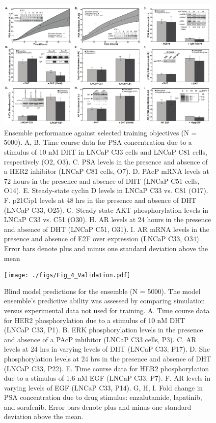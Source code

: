 \documentclass[12pt]{article}
\begin{document}
\clearpage

\begin{figure}\centering
\includegraphics[width=1.0\textwidth]{./figs/Fig_2_Training.pdf}
\caption{Ensemble performance against selected training objectives (N = 5000). A, B. Time course data for PSA concentration due to a stimulus of 10 nM DHT in LNCaP C33 cells and LNCaP C81 cells, respectively (O2, O3). C. PSA levels in the presence and absence of a HER2 inhibitor (LNCaP C81 cells, O7). D. PAcP mRNA levels at 72 hours in the presence and absence of DHT (LNCaP C51 cells, O14). E. Steady-state cyclin D levels in LNCaP C33 vs. C81 (O17). F. p21Cip1 levels at 48 hrs in the presence and absence of DHT (LNCaP C33, O25). G. Steady-state AKT phosphorylation levels in LNCaP C33 vs. C51 (O30). H. AR levels at 24 hours in the presence and absence of DHT (LNCaP C51, O31). I. AR mRNA levels in the presence and absence of E2F over expression (LNCaP C33, O34). Error bars denote plus and minus one standard deviation above the mean}
\label{fg:Training}
\end{figure}

\clearpage

\begin{figure}\centering
\texttt{[image: ./figs/Fig\_4\_Validation.pdf]}
\caption{Blind model predictions for the ensemble (N = 5000). The model ensemble’s predictive ability was assessed by comparing simulation versus experimental data not used for training. A. Time course data for HER2 phosphorylation due to a stimulus of 10 nM DHT (LNCaP C33, P1). B. ERK phosphorylation levels in the presence and absence of a PAcP inhibitor (LNCaP C33 cells, P3). C. AR levels at 24 hrs in varying levels of DHT (LNCaP C33, P17). D. Shc phosphorylation levels at 24 hrs in the presence and absence of DHT (LNCaP C33, P22). E. Time course data for HER2 phosphorylation due to a stimulus of 1.6 nM EGF (LNCaP C33, P7). F. AR levels in varying levels of EGF (LNCaP C33, P14). G, H, I. Fold change in PSA concentration due to drug stimulus: enzalutamide, lapatinib, and sorafenib. Error bars denote plus and minus one standard deviation above the mean.}
\label{fg:Validation}
\end{figure}
\end{document}
